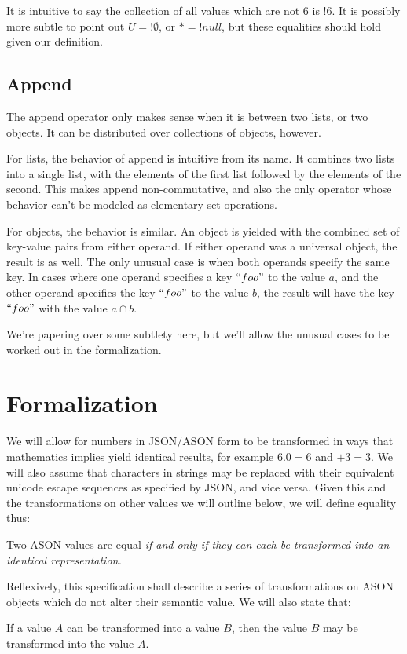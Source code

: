 \documentclass[letterpaper]{article}
\begin{document}
It is intuitive to say the collection of all values which are not \(6\) is
\(!6\). It is possibly more subtle to point out \(U = !\emptyset\), or \(* =
!null\), but these equalities should hold given our definition.

\subsection{Append}
The append operator only makes sense when it is between two lists, or two
objects. It can be distributed over collections of objects, however.

For lists, the behavior of append is intuitive from its name. It combines two
lists into a single list, with the elements of the first list followed by the
elements of the second. This makes append non-commutative, and also the only
operator whose behavior can't be modeled as elementary set operations.

For objects, the behavior is similar. An object is yielded with the combined
set of key-value pairs from either operand. If either operand was a universal
object, the result is as well. The only unusual case is when both operands
specify the same key. In cases where one operand specifies a key \(``foo"\) to
the value \(a\), and the other operand specifies the key \(``foo"\) to the
value \(b\), the result will have the key \(``foo"\) with the value \(a\cap b\).

We're papering over some subtlety here, but we'll allow the unusual cases to be
worked out in the formalization.

\section{Formalization}
\begin{samepage}
We will allow for numbers in JSON/ASON form to be transformed in ways that
mathematics implies yield identical results, for example \(6.0 = 6\) and \(+3 =
3\). We will also assume that characters in strings may be replaced with their
equivalent unicode escape sequences as specified by JSON, and vice versa.
Given this and the transformations on other values we will outline below, we
will define equality thus:
%
\begin{prule}
Two ASON values are equal \em if and only if \em they can each be transformed
into an identical representation.
\end{prule}
\end{samepage}

\begin{samepage}
Reflexively, this specification shall describe a series of transformations on
ASON objects which do not alter their semantic value. We will also state that:
%
\begin{prule}
\label{sec:commute}
If a value \(A\) can be transformed into a value \(B\), then the value \(B\)
may be transformed into the value \(A\).
\end{prule}
\end{samepage}
\end{document}

